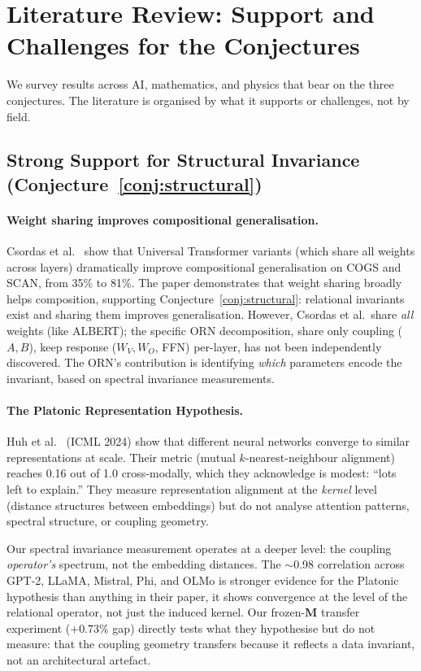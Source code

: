 \documentclass[11pt, a4paper]{article}
\newcommand{\M}{\mathbf{M}}
\theoremstyle{plain}
\theoremstyle{definition}
\theoremstyle{remark}
\begin{document}
\section{Literature Review: Support and Challenges for the Conjectures}
\label{sec:literature}

We survey results across AI, mathematics, and physics that bear on the three conjectures.
The literature is organised by what it supports or challenges, not by field.

\subsection{Strong Support for Structural Invariance (Conjecture~\ref{conj:structural})}

\paragraph{Weight sharing improves compositional generalisation.}
Csordas et al.~\cite{csordas2021compositional} show that Universal Transformer variants (which share all weights across layers) dramatically improve compositional generalisation on COGS and SCAN, from 35\% to 81\%.
The paper demonstrates that weight sharing broadly helps composition, supporting Conjecture~\ref{conj:structural}: relational invariants exist and sharing them improves generalisation.
However, Csordas et al.\ share \emph{all} weights (like ALBERT); the specific ORN decomposition, share only coupling ($A, B$), keep response ($W_V, W_O$, FFN) per-layer, has not been independently discovered.
The ORN's contribution is identifying \emph{which} parameters encode the invariant, based on spectral invariance measurements.

\paragraph{The Platonic Representation Hypothesis.}
Huh et al.~\cite{huh2024platonic} (ICML 2024) show that different neural networks converge to similar representations at scale.
Their metric (mutual $k$-nearest-neighbour alignment) reaches 0.16 out of 1.0 cross-modally, which they acknowledge is modest: ``lots left to explain.''
They measure representation alignment at the \emph{kernel} level (distance structures between embeddings) but do not analyse attention patterns, spectral structure, or coupling geometry.

Our spectral invariance measurement operates at a deeper level: the coupling \emph{operator's} spectrum, not the embedding distances.
The $\sim$0.98 correlation across GPT-2, LLaMA, Mistral, Phi, and OLMo is stronger evidence for the Platonic hypothesis than anything in their paper, it shows convergence at the level of the relational operator, not just the induced kernel.
Our frozen-$\M$ transfer experiment ($+0.73\%$ gap) directly tests what they hypothesise but do not measure: that the coupling geometry transfers because it reflects a data invariant, not an architectural artefact.
\end{document}
